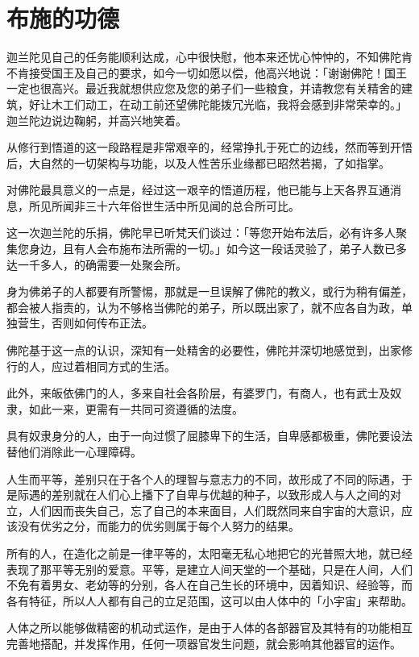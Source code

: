 \documentclass[12pt,twoside,openany]{book}
\begin{document}
\section{布施的功德}\label{sec3.12}

迦兰陀见自己的任务能顺利达成，心中很快慰，他本来还忧心忡忡的，不知佛陀肯不肯接受国王及自己的要求，如今一切如愿以偿，他高兴地说：「谢谢佛陀！国王一定也很高兴。最近我就想供应您及您的弟子们一些粮食，并请教您有关精舍的建筑，好让木工们动工，在动工前还望佛陀能拨冗光临，我将会感到非常荣幸的。」迦兰陀边说边鞠躬，并高兴地笑着。

从修行到悟道的这一段路程是非常艰辛的，经常挣扎于死亡的边线，然而等到开悟后，大自然的一切架构与功能，以及人性苦乐业缘都已昭然若揭，了如指掌。

对佛陀最具意义的一点是，经过这一艰辛的悟道历程，他已能与上天各界互通消息，所见所闻非三十六年俗世生活中所见闻的总合所可比。

这一次迦兰陀的乐捐，佛陀早已听梵天们谈过：「等您开始布法后，必有许多人聚集您身边，且有人会布施布法所需的一切。」如今这一段话灵验了，弟子人数已多达一千多人，的确需要一处聚会所。

身为佛弟子的人都要有所警惕，那就是一旦误解了佛陀的教义，或行为稍有偏差，都会被人指责的，认为不够格当佛陀的弟子，所以既出家了，就不应各自为政，单独营生，否则如何传布正法。

佛陀基于这一点的认识，深知有一处精舍的必要性，佛陀并深切地感觉到，出家修行的人，应过着相同方式的生活。

此外，来皈依佛门的人，多来自社会各阶层，有婆罗门，有商人，也有武士及奴隶，如此一来，更需有一共同可资遵循的法度。

具有奴隶身分的人，由于一向过惯了屈膝卑下的生活，自卑感都极重，佛陀要设法替他们消除此一心理障碍。

人生而平等，差别只在于各个人的理智与意志力的不同，故形成了不同的际遇，于是际遇的差别就在人们心上播下了自卑与优越的种子，以致形成人与人之间的对立，人们因而丧失自己，忘了自己的本来面目，人们既然同来自宇宙的大意识，应该没有优劣之分，而能力的优劣则属于每个人努力的结果。

所有的人，在造化之前是一律平等的，太阳毫无私心地把它的光普照大地，就已经表现了那平等无别的爱意。平等，是建立人间天堂的一个基础，只是在人间，人们不免有着男女、老幼等的分别，各人在自己生长的环境中，因着知识、经验等，而各有特征，所以人人都有自己的立足范围，这可以由人体中的「小宇宙」来帮助。

人体之所以能够做精密的机动式运作，是由于人体的各部器官及其特有的功能相互完善地搭配，并发挥作用，任何一项器官发生问题，就会影响其他器官的运作。
\end{document}
